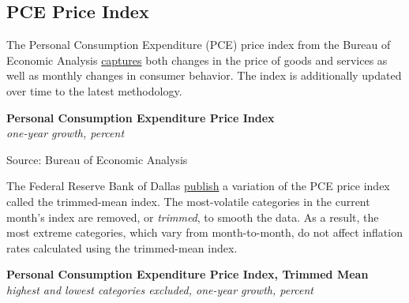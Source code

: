 \documentclass{report}
\makeatletter
\newcommand{\tbllink}[1]{\href{https://raw.githubusercontent.com/bdecon/US-chartbook/master/chartbook/data/#1}{\faTable}}
\newcommand*\short[1]{\expandafter\@gobbletwo\number\numexpr#1\relax}
\newcommand{\dateaxisticks}{
		date coordinates in=x, axis line style={draw=none},
		xmax={2023-11-30},
		max space between ticks=40,	    
		xtick={{1990-01-01}, {1992-01-01}, {1994-01-01}, 
			{1996-01-01}, {1998-01-01}, {2000-01-01}, 
			{2002-01-01}, {2004-01-01}, {2006-01-01},
			{2008-01-01}, {2010-01-01}, {2012-01-01}, {2014-01-01},
		    {2016-01-01}, {2018-01-01}, {2020-01-01}, {2022-01-01}, 
		    {2024-01-01}, {2026-01-01}},
		minor xtick={{1989-01-01}, {1991-01-01}, {1993-01-01},
			{1995-01-01}, {1997-01-01}, {1999-01-01}, 
			{2001-01-01}, {2003-01-01}, {2005-01-01}, {2007-01-01},
		    {2009-01-01}, {2011-01-01}, {2013-01-01}, {2015-01-01},
		    {2017-01-01}, {2019-01-01}, {2021-01-01}, {2023-01-01}, 
		    {2025-01-01}, {2027-01-01}},
		enlarge y limits={0.06}, enlarge x limits={0.01},
		xticklabel style={align=center, yshift=-2pt}, tick label style={inner sep=0pt},
		}
\newcommand{\bbar}[2]{extra #1 ticks = {{#2}}, extra #1 tick labels = ,
		extra #1 tick style = {grid=major, grid style={thick, black!25}},}
\newcommand{\stdline}[4]{\addplot[very thick, no markers, color=#1] 
		table [x=#2, y=#3, col sep=comma] {#4};	}
\newcommand{\rbars}{
		\fill[color=black!10] (axis cs:{1990-07-01},\pgfkeysvalueof{/pgfplots/ymin}) rectangle 
			(axis cs:{1991-03-01}, \pgfkeysvalueof{/pgfplots/ymax});
		\fill[color=black!10] (axis cs:{2007-12-01},\pgfkeysvalueof{/pgfplots/ymin}) rectangle 
			(axis cs:{2009-07-01}, \pgfkeysvalueof{/pgfplots/ymax});
		\fill[color=black!10] (axis cs:{2001-03-01},\pgfkeysvalueof{/pgfplots/ymin}) rectangle 
			(axis cs:{2001-11-01}, \pgfkeysvalueof{/pgfplots/ymax});
		\fill[color=black!10] (axis cs:{2020-02-01},\pgfkeysvalueof{/pgfplots/ymin}) rectangle 
			(axis cs:{2020-05-01}, \pgfkeysvalueof{/pgfplots/ymax});}
\makeatother
\begin{document}
{{\begin{minipage}{0.76\textwidth}
\subsection*{PCE Price Index}
\small The Personal Consumption Expenditure (PCE) price index from the Bureau of Economic Analysis \href{https://www.bea.gov/data/personal-consumption-expenditures-price-index}{captures} both changes in the price of goods and services as well as monthly changes in consumer behavior. The index is additionally updated over time to the latest methodology. 


\vspace{1mm}

\normalsize \textbf{Personal Consumption Expenditure Price Index}\\
\footnotesize{\textit{one-year growth, percent}}
\vspace{3.8cm}

\hspace{2mm} 

\footnotesize{Source: Bureau of Economic Analysis} \hfill \tbllink{pce_pi.csv}
\vspace{5mm}

\small The Federal Reserve Bank of Dallas \href{https://www.dallasfed.org/research/pce}{publish} a variation of the PCE price index called the trimmed-mean index. The most-volatile categories in the current month's index are removed, or \textit{trimmed}, to smooth the data. As a result, the most extreme categories, which vary from month-to-month, do not affect inflation rates calculated using the trimmed-mean index. 


\vspace{1mm}

\normalsize \textbf{Personal Consumption Expenditure Price Index, Trimmed Mean}\\
\footnotesize{\textit{highest and lowest categories excluded, one-year growth, percent}}
\vspace{2.9cm}


\end{minipage}}}
\end{document}
